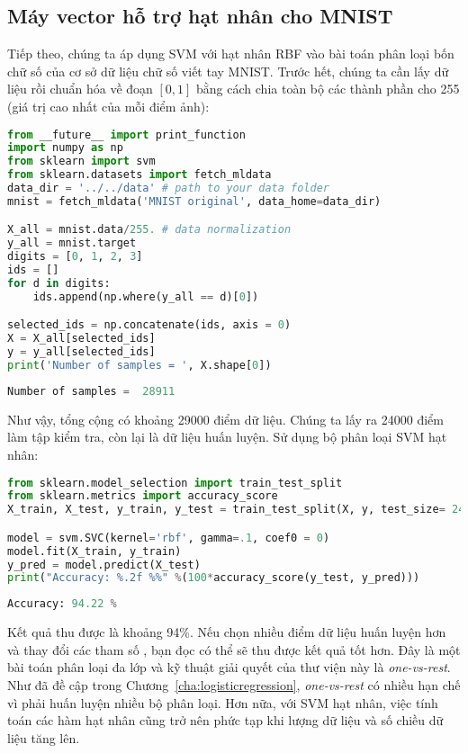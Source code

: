 

\subsection{Máy vector hỗ trợ hạt nhân cho MNIST}
Tiếp theo, chúng ta áp dụng SVM với hạt nhân RBF vào bài toán phân loại bốn chữ số  của cơ sở dữ liệu chữ số viết tay MNIST.
Trước hết, chúng ta cần lấy dữ liệu rồi chuẩn hóa về đoạn $[0, 1]$ bằng cách chia toàn bộ các thành phần cho 255 (giá trị cao
nhất của mỗi điểm ảnh):
\begin{lstlisting}[language=Python]
from __future__ import print_function
import numpy as np
from sklearn import svm
from sklearn.datasets import fetch_mldata
data_dir = '../../data' # path to your data folder
mnist = fetch_mldata('MNIST original', data_home=data_dir)

X_all = mnist.data/255. # data normalization
y_all = mnist.target
digits = [0, 1, 2, 3]
ids = []
for d in digits:
    ids.append(np.where(y_all == d)[0])

selected_ids = np.concatenate(ids, axis = 0)
X = X_all[selected_ids]
y = y_all[selected_ids]
print('Number of samples = ', X.shape[0])
\end{lstlisting}
\kq
\begin{lstlisting}[language=Python]
Number of samples =  28911
\end{lstlisting}
Như vậy, tổng cộng có khoảng 29000 điểm dữ liệu. Chúng ta lấy ra 24000
điểm làm tập kiểm tra, còn lại là dữ liệu huấn luyện. Sử dụng bộ phân loại SVM hạt nhân:
\begin{lstlisting}[language=Python]
from sklearn.model_selection import train_test_split
from sklearn.metrics import accuracy_score
X_train, X_test, y_train, y_test = train_test_split(X, y, test_size= 24000)

model = svm.SVC(kernel='rbf', gamma=.1, coef0 = 0)
model.fit(X_train, y_train)
y_pred = model.predict(X_test)
print("Accuracy: %.2f %%" %(100*accuracy_score(y_test, y_pred)))
\end{lstlisting}
\kq
\begin{lstlisting}[language=Python]
Accuracy: 94.22 %
\end{lstlisting}
Kết quả thu được là khoảng 94\%. Nếu chọn nhiều điểm dữ liệu huấn luyện hơn và
thay đổi các tham số , bạn đọc có thể sẽ thu được
kết quả tốt hơn. Đây là một bài toán phân loại đa lớp và
kỹ thuật giải quyết của thư viện này là \textit{one-vs-rest}. Như đã đề cập trong
Chương~\ref{cha:logisticregression}, \textit{one-vs-rest} có nhiều hạn chế vì
phải huấn luyện nhiều bộ phân loại. Hơn nữa, với SVM hạt nhân, việc tính toán các
hàm hạt nhân cũng trở nên phức tạp khi lượng dữ liệu và số chiều dữ liệu tăng lên.


